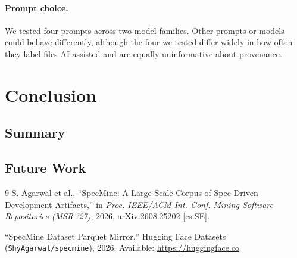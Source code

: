 \documentclass{article}
\begin{document}
\paragraph{Prompt choice.} We tested four prompts across two model families. Other prompts or models could behave differently, although the four we tested differ widely in how often they label files AI-assisted and are equally uninformative about provenance.

\section{Conclusion}
\subsection{Summary}

\subsection{Future Work}

\begin{thebibliography}{9}
S. Agarwal et al., ``SpecMine: A Large-Scale Corpus of Spec-Driven Development Artifacts,'' in \textit{Proc. IEEE/ACM Int. Conf. Mining Software Repositories (MSR '27)}, 2026, arXiv:2608.25202 [cs.SE].

``SpecMine Dataset Parquet Mirror,'' Hugging Face Datasets (\texttt{ShyAgarwal/specmine}), 2026. Available: \url{https://huggingface.co}
\end{thebibliography}
\end{document}
